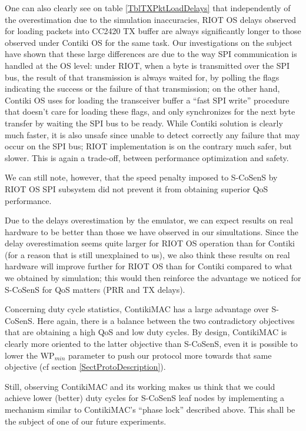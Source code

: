 \documentclass[conference]{IEEEtran}
\begin{document}
One can also clearly see on table \ref{TblTXPktLoadDelays} that independently
of the overestimation due to the simulation inaccuracies, RIOT OS delays
observed for loading packets into CC2420 TX buffer are always significantly
longer to those observed under Contiki OS for the same task.
Our investigations on the subject have shown that these large differences
are due to the way SPI communication is handled at the OS level: under RIOT,
when a byte is transmitted over the SPI bus, the result of that transmission
is always waited for, by polling the flags indicating the success or the
failure of that transmission; on the other hand, Contiki OS uses for loading
the transceiver buffer a ``fast SPI write'' procedure that doesn't care for
loading these flags, and only synchronizes for the next byte transfer by
waiting the SPI bus to be ready. While Contiki solution is clearly much
faster, it is also unsafe since unable to detect correctly any failure
that may occur on the SPI bus; RIOT implementation is on the contrary
much safer, but slower. This is again a trade-off, between performance
optimization and safety.

We can still note, however, that the speed penalty imposed to S-CoSenS by
RIOT OS SPI subsystem did not prevent it from obtaining superior QoS
performance.

Due to the delays overestimation by the emulator, we can expect results on
real hardware to be better than those we have observed in our simultations.
Since the delay overestimation seems quite larger for RIOT OS operation
than for Contiki (for a reason that is still unexplained to us),
we also think these results on real hardware will improve further
for RIOT OS than for Contiki compared to what we obtained by simulation;
this would then reinforce the advantage we noticed for S-CoSenS for
QoS matters (PRR and TX delays).

Concerning duty cycle statistics, ContikiMAC has a large advantage over
S-CoSenS. Here again, there is a balance between the two contradictory
objectives that are obtaining a high QoS and low duty cycles. By design,
ContikiMAC is clearly more oriented to the latter objective than S-CoSenS,
even it is possible to lower the $\mathrm{WP}_{min}$ parameter to push
our protocol more towards that same objective (cf section
\ref{SectProtoDescription}).

Still, observing ContikiMAC and its working makes us think that we could
achieve lower (better) duty cycles for S-CoSenS leaf nodes by implementing
a mechanism similar to ContikiMAC's ``phase lock'' described above. This
shall be the subject of one of our future experiments.
\end{document}
